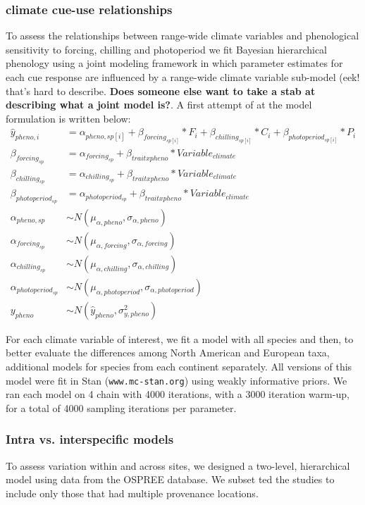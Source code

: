 \documentclass[12pt]{article}\usepackage[]{graphicx}\usepackage[]{color}
\begin{document}
\subsubsection*{climate cue-use relationships}
To assess the relationships between range-wide climate variables and phenological sensitivity to forcing, chilling and photoperiod we fit Bayesian hierarchical phenology using a joint modeling framework in which parameter estimates for each cue response are influenced by a range-wide climate variable sub-model (eek! that's hard to describe. \textbf{Does someone else want to take a stab at describing what a joint model is?}. A first attempt of at the model formulation is written below:\\

\begin{align*}
\hat{y}_{pheno, i} &= \alpha_{pheno, sp[i]} + \beta_{forcing_{sp[i]}}*F_i+\beta_{chilling_{sp[i]}}*C_i+\beta_{photoperiod_{sp[i]}}*P_i \\
\beta_{forcing_{sp}} & = \alpha_{forcing_{sp}} + \beta_{trait x pheno}*Variable_{climate} \\
\beta_{chilling_{sp}} & = \alpha_{chilling_{sp}} + \beta_{trait x pheno}*Variable_{climate} \\
\beta_{photoperiod_{sp}} & = \alpha_{photoperiod_{sp}} + \beta_{trait x pheno}*Variable_{climate} \\
\alpha_{pheno, sp} & \sim N(\mu_{\alpha, pheno}, \sigma_{\alpha, pheno}) \\
\alpha_{forcing_{sp}} & \sim N(\mu_{\alpha, forcing}, \sigma_{\alpha, forcing})\\
\alpha_{chilling_{sp}} & \sim N(\mu_{\alpha, chilling}, \sigma_{\alpha, chilling})\\
\alpha_{photoperiod_{sp}} & \sim N(\mu_{\alpha, photoperiod}, \sigma_{\alpha, photoperiod})\\
y_{pheno} & \sim N(\hat{y}_{pheno},\sigma^2_{y, pheno}) 
\end{align*}

For each climate variable of interest, we fit a model with all species and then, to better evaluate the differences among North American and European taxa, additional models for species from each continent separately. All versions of this model were fit in Stan \citep{Carpenter2017}(\texttt{www.mc-stan.org}) using weakly informative priors. We ran each model on 4 chain with 4000 iterations, with a 3000 iteration warm-up, for a total of 4000 sampling iterations per parameter. 

\subsubsection*{Intra vs. interspecific models}
To assess variation within and across sites, we designed a two-level, hierarchical model using data from the OSPREE database. We subset ted the studies to include only those that had multiple provenance locations. 
\end{document}
